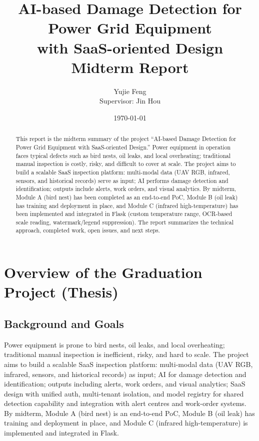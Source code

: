 \documentclass[12pt,a4paper]{article}
\title{AI-based Damage Detection for Power Grid Equipment\\with SaaS-oriented Design\\Midterm Report}
\author{Yujie Feng\\Supervisor: Jin Hou}
\date{\today}
\begin{document}
\maketitle

\begin{abstract}
This report is the midterm summary of the project ``AI-based Damage Detection for Power Grid Equipment with SaaS-oriented Design.'' Power equipment in operation faces typical defects such as bird nests, oil leaks, and local overheating; traditional manual inspection is costly, risky, and difficult to cover at scale. The project aims to build a scalable SaaS inspection platform: multi-modal data (UAV RGB, infrared, sensors, and historical records) serve as input; AI performs damage detection and identification; outputs include alerts, work orders, and visual analytics. By midterm, Module A (bird nest) has been completed as an end-to-end PoC, Module B (oil leak) has training and deployment in place, and Module C (infrared high-temperature) has been implemented and integrated in Flask (custom temperature range, OCR-based scale reading, watermark/legend suppression). The report summarizes the technical approach, completed work, open issues, and next steps.
\end{abstract}

\tableofcontents
\newpage

\section{Overview of the Graduation Project (Thesis)}

\subsection{Background and Goals}

Power equipment is prone to bird nests, oil leaks, and local overheating; traditional manual inspection is inefficient, risky, and hard to scale. The project aims to build a scalable SaaS inspection platform: multi-modal data (UAV RGB, infrared, sensors, and historical records) as input; AI for damage detection and identification; outputs including alerts, work orders, and visual analytics; SaaS design with unified auth, multi-tenant isolation, and model registry for shared detection capability and integration with alert centres and work-order systems. By midterm, Module A (bird nest) is an end-to-end PoC, Module B (oil leak) has training and deployment in place, and Module C (infrared high-temperature) is implemented and integrated in Flask.
\end{document}
